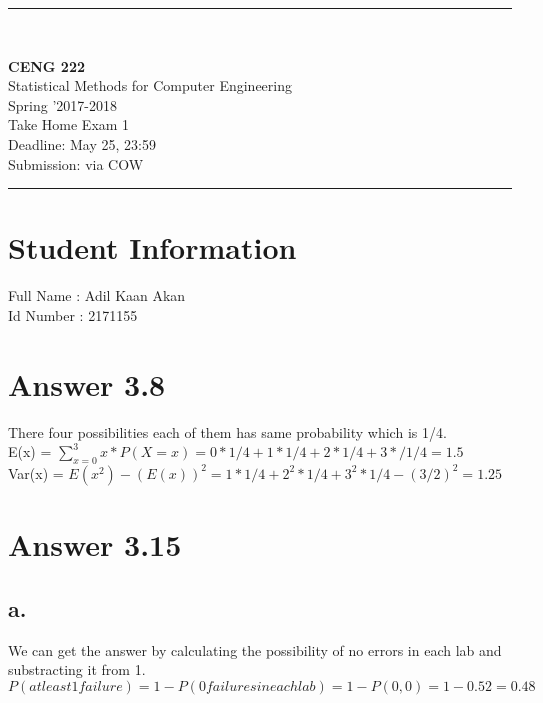 \documentclass[12pt]{article}
\newcommand{\HRule}{\rule{\linewidth}{1mm}}
\begin{document}
\noindent
\HRule \\[3mm]
\begin{flushright}

                                         \LARGE \textbf{CENG 222}  \\[4mm]
                                         \Large Statistical Methods for Computer Engineering \\[4mm]
                                        \normalsize      Spring '2017-2018 \\
                                           \Large   Take Home Exam 1 \\
                    \normalsize Deadline: May 25, 23:59 \\
                    \normalsize Submission: via COW
\end{flushright}
\HRule

\section*{Student Information }
Full Name :  Adil Kaan Akan\\
Id Number :  2171155 \\

\section*{Answer 3.8}
There four possibilities each of them has same probability which is 1/4. \\

E(x) = $\sum\limits_{x=0}^{3} x*P(X=x) = 0*1/4 + 1*1/4+2*1/4+3*/1/4 = 1.5$ \\
Var(x) = $E(x^2) - (E(x))^2 = 1*1/4+2^2*1/4+3^2*1/4 - (3/2)^2 = 1.25$ \\




\section*{Answer 3.15}
\subsection*{a.}
We can get the answer by calculating the possibility of no errors in each lab and substracting it from 1.\\
$P(at least 1 failure) = 1 - P(0 failures in each lab) = 1 - P(0,0) = 1 - 0.52  = 0.48$ \\
\end{document}
